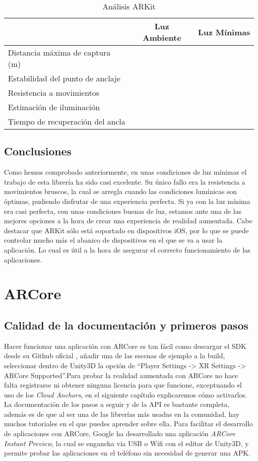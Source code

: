 \begin{table}[H]
    \centering
    \begin{tabular}{|l|c|c|}
    \hline
          & Luz Ambiente & Luz Mínimas \\
         \hline
        Distancia máxima de captura (m)  & &\\
        \hline
        Estabilidad del punto de anclaje  & &\\
        \hline
        Resistencia a movimientos  & & \\
        \hline
        Estimación de iluminación  & & \\
        \hline
        Tiempo de recuperación del ancla  & & \\
      \hline
    \end{tabular}
    \caption{Análisis ARKit}
    \label{tab:TARKit}
\end{table}

\subsection{Conclusiones}
Como hemos comprobado anteriormente, en unas condiciones de luz mínimas el trabajo de esta librería ha sido casi excelente. Su único fallo era la resistencia a movimientos bruscos, la cual se arregla cuando las condiciones lumínicas son óptimas, pudiendo disfrutar de una experiencia perfecta. Si ya con la luz mínima era casi perfecta, con unas condiciones buenas de luz, estamos ante una de las mejores opciones a la hora de crear una experiencia de realidad aumentada. Cabe destacar que ARKit sólo está soportado en dispositivos iOS, por lo que se puede controlar mucho más el abanico de dispositivos en el que se va a usar la aplicación. Lo cual es útil a la hora de asegurar el correcto funcionamiento de las aplicaciones.

\clearpage
\section{ARCore}
\subsection{Calidad de la documentación y primeros pasos}
Hacer funcionar una aplicación con ARCore es tan fácil como descargar el SDK desde su Github oficial \cite{Github_Google}, añadir una de las escenas de ejemplo a la build, seleccionar dentro de Unity3D la opción de ``Player Settings -> XR Settings -> ARCore Supported''.Para probar la realidad aumentada con ARCore no hace falta registrarse ni obtener ninguna licencia para que funcione, exceptuando el uso de los \textit{Cloud Anchors}, en el siguiente capítulo explicaremos cómo activarlos. La documentación de los pasos a seguir y de la API es bastante completa, además es de que al ser una de las librerías más usadas en la comunidad, hay muchos tutoriales en el que puedes aprender sobre ella. Para facilitar el desarrollo de aplicaciones con ARCore, Google ha desarrollado una aplicación \textit{ARCore Instant Preview}, la cual se engancha vía USB o Wifi con el editor de Unity3D, y permite probar las aplicaciones en el teléfono sin necesidad de generar una APK.
